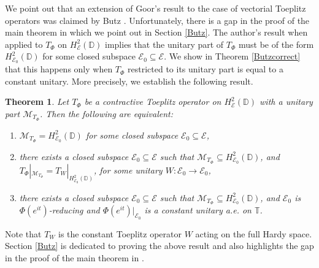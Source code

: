 \documentclass[12pt]{amsart}
\numberwithin{equation}{section}
\newtheorem{thm}[propn]{Theorem}
\theoremstyle{definition}
\newcommand{\D}{\mathbb{D}}
\newcommand{\T}{\mathbb{T}}
\newcommand{\1}{{\mbox{\bf 1}}}
\newcommand{\cle}{\mathcal{E}}
\newcommand{\clm}{\mathcal{M}}
\newcommand{\raro}{\rightarrow}
\begin{document}
We point out that an extension of Goor's result to the case of vectorial Toeplitz operators was claimed by Butz \cite{Butz}. Unfortunately, there is a gap in the proof of the main theorem in \cite{Butz} which we point out in Section \ref{Butz}.
The author's result when applied to $T_{\Phi}$ on $H_{\cle}^2(\D)$ implies that the unitary part of $T_{\Phi}$ must be of the form $H_{\cle_0}^2(\D)$ for some closed subspace $\cle_0 \subseteq \cle$. We show in Theorem \ref{Butzcorrect} that this happens only when $T_{\Phi}$ restricted to its unitary part is equal to a constant unitary.  More precisely, we establish the following result.
\begin{thm}
Let $T_{\Phi}$ be a contractive Toeplitz operator on $H_{\cle}^2(\D)$ with a unitary part $\clm_{T_{\Phi}}$. Then the following are equivalent:
\begin{enumerate}
\item[(i)] $\clm_{T_{\Phi}} = H_{\cle_0}^2(\D)$ for some closed subspace $\cle_0 \subseteq \cle$,
\item[(ii)] there exists a closed subspace $\cle_0 \subseteq \cle$ such that $\clm_{T_{\Phi}} \subseteq H_{\cle_0}^2(\D)$, and $T_{\Phi}|_{\clm_{T_{\Phi}}} = T_W|_{H_{\cle_0}^2(\D)}$, for some unitary $W: \cle_0 \raro \cle_0$,
\item[(iii)] there exists a closed subspace $\cle_0 \subseteq \cle$ such that $\clm_{T_{\Phi}} \subseteq H_{\cle_0}^2(\D)$, and $\cle_0$ is $\Phi(e^{it})$-reducing and $\Phi(e^{it})|_{\cle_0}$ is a constant unitary a.e. on $\T$.
\end{enumerate}
\end{thm}
Note that $T_W$ is the constant Toeplitz operator  $W$ acting on the full Hardy space. Section \ref{Butz} is dedicated to proving the above result and also highlights the gap in the proof of the main theorem in \cite{Butz}.
\end{document}
